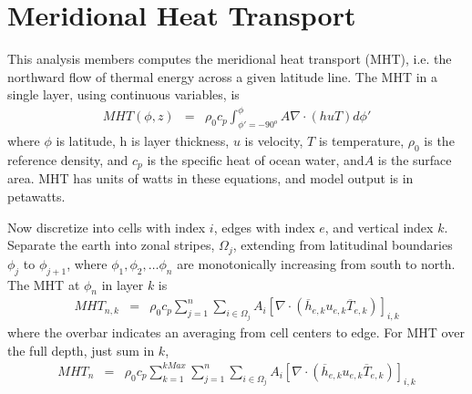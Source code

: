 \section{Meridional Heat Transport}
\label{sec:meridional heat transport}

This analysis members computes the meridional heat transport (MHT), i.e. the northward flow of thermal energy across a given latitude line.  The MHT in a single layer, using continuous variables, is
\begin{eqnarray}
MHT(\phi,z) &=& \rho_0 c_p \int_{\phi'=-90^o}^{\phi}  A \nabla \cdot (h u T) d \phi'
\end{eqnarray}
where $\phi$ is latitude, h is layer thickness, $u$ is velocity, $T$ is temperature, $ \rho_0$ is the reference density, and $c_p$ is the specific heat of ocean water, and$A$ is the surface area.  MHT has units of watts in these equations, and model output is in petawatts.

Now discretize into cells with index $i$, edges with index $e$, and vertical index $k$.  Separate the earth into zonal stripes, $\Omega_j$, extending from latitudinal boundaries $\phi_j$ to $\phi_{j+1}$, where $\phi_1, \phi_2, \ldots \phi_n$ are monotonically increasing from south to north.  The MHT at $\phi_n$ in layer $k$ is
\begin{eqnarray}
MHT_{n,k} &=& \rho_0 c_p 
\sum_{j=1}^{n}
{\sum_{i \in \Omega_j} A_i \left[\nabla \cdot ({\overline h}_{e,k} u_{e,k} {\overline T}_{e,k}) \right]_{i,k} }
\end{eqnarray}
where the overbar indicates an averaging from cell centers to edge.  For MHT over the full depth, just sum in $k$,
\begin{eqnarray}
MHT_{n} &=& \rho_0 c_p 
\sum_{k=1}^{kMax}
\sum_{j=1}^{n}
{\sum_{i \in \Omega_j} A_i \left[\nabla \cdot ({\overline h}_{e,k} u_{e,k} {\overline T}_{e,k}) \right]_{i,k} }
\end{eqnarray}




